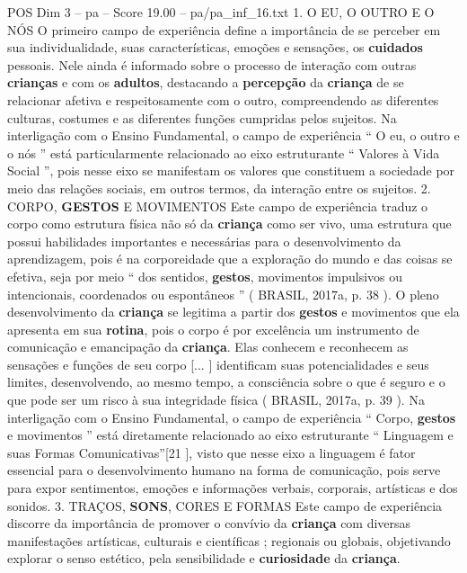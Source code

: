 \begin{textsample}{POS Dim 3 – pa – Score 19.00 – pa/pa\_inf\_16.txt}  \label{ex:f3_pos_232}
1.
O EU, O OUTRO E O NÓS O primeiro campo de experiência define a importância de se perceber em sua individualidade, suas características, emoções e sensações, os \textbf{cuidados} pessoais.
Nele ainda é informado sobre o processo de interação com outras \textbf{crianças} e com os \textbf{adultos}, destacando a \textbf{percepção} da \textbf{criança} de se relacionar afetiva e respeitosamente com o outro, compreendendo as diferentes culturas, costumes e as diferentes funções cumpridas pelos sujeitos.
Na interligação com o Ensino Fundamental, o campo de experiência “ O eu, o outro e o nós ” está particularmente relacionado ao eixo estruturante “ Valores à Vida Social ”, pois nesse eixo se manifestam os valores que constituem a sociedade por meio das relações sociais, em outros termos, da interação entre os sujeitos. 2.
CORPO, \textbf{GESTOS} E MOVIMENTOS Este campo de experiência traduz o corpo como estrutura física não só da \textbf{criança} como ser vivo, uma estrutura que possui habilidades importantes e necessárias para o desenvolvimento da aprendizagem, pois é na corporeidade que a exploração do mundo e das coisas se efetiva, seja por meio “ dos sentidos, \textbf{gestos}, movimentos impulsivos ou intencionais, coordenados ou espontâneos ” ( BRASIL, 2017a, p. 38 ).
O pleno desenvolvimento da \textbf{criança} se legitima a partir dos \textbf{gestos} e movimentos que ela apresenta em sua \textbf{rotina}, pois o corpo é por excelência um instrumento de comunicação e emancipação da \textbf{criança}.
Elas conhecem e reconhecem as sensações e funções de seu corpo [... ] identificam suas potencialidades e seus limites, desenvolvendo, ao mesmo tempo, a consciência sobre o que é seguro e o que pode ser um risco à sua integridade física ( BRASIL, 2017a, p. 39 ).
Na interligação com o Ensino Fundamental, o campo de experiência “ Corpo, \textbf{gestos} e movimentos ” está diretamente relacionado ao eixo estruturante “ Linguagem e suas Formas Comunicativas”[21 ], visto que nesse eixo a linguagem é fator essencial para o desenvolvimento humano na forma de comunicação, pois serve para expor sentimentos, emoções e informações verbais, corporais, artísticas e dos sonidos. 3.
TRAÇOS, \textbf{SONS}, CORES E FORMAS Este campo de experiência discorre da importância de promover o convívio da \textbf{criança} com diversas manifestações artísticas, culturais e científicas ; regionais ou globais, objetivando explorar o senso estético, pela sensibilidade e \textbf{curiosidade} da \textbf{criança}.

\end{textsample}
